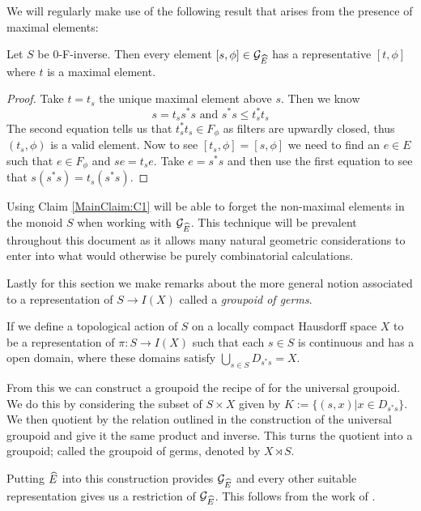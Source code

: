 We will regularly make use of the following result that arises from the presence of maximal elements:

\begin{claim}\label{MainClaim:C1}
Let $S$ be 0-F-inverse. Then every element $[s,\phi] \in \mathcal{G}_{\widehat{E}}$ has a representative $[t,\phi]$ where $t$ is a maximal element.
\end{claim}
\begin{proof}
Take $t=t_{s}$ the unique maximal element above $s$. Then we know 
\begin{equation*}
s = t_{s}s^{*}s \mbox{ and } s^{*}s \leq t_{s}^{*}t_{s}
\end{equation*} 
The second equation tells us that $t_{s}^{*}t_{s} \in F_{\phi}$ as filters are upwardly closed, thus $(t_{s},\phi)$ is a valid element. Now to see $[t_{s},\phi]=[s,\phi]$ we need to find an $e \in E$ such that $e \in F_{\phi}$ and $se=t_{s}e$. Take $e=s^{*}s$ and then use the first equation to see that $s(s^{*}s)=t_{s}(s^{*}s)$.
\end{proof}
Using Claim \ref{MainClaim:C1} will be able to forget the non-maximal elements in the monoid $S$ when working with $\mathcal{G}_{\widehat{E}}$. This technique will be prevalent throughout this document as it allows many natural geometric considerations to enter into what would otherwise be purely combinatorial calculations.

Lastly for this section we make remarks about the more general notion associated to a representation of $S \rightarrow I(X)$ called a \textit{groupoid of germs}.

\begin{remark}
If we define a topological action of $S$ on a locally compact Hausdorff space $X$ to be a representation of $\pi:S \rightarrow I(X)$ such that each $s \in S$ is continuous and has a open domain, where these domains satisfy $\bigcup_{s \in S}D_{s^{*}s} = X$.

From this we can construct a groupoid the recipe of for the universal groupoid. We do this by considering the subset of $S \times X$ given by $K:=\lbrace (s,x) | x \in D_{s^{*}s}\rbrace$. We then quotient by the relation outlined in the construction of the universal groupoid and give it the same product and inverse. This turns the quotient into a groupoid; called the groupoid of germs, denoted by $X \rtimes S$.

Putting $\widehat{E}$ into this construction provides $\mathcal{G}_{\widehat{E}}$ and every other suitable representation gives us a restriction of $\mathcal{G}_{\widehat{E}}$. This follows from the work of \cite{MR2419901}.
 
\end{remark}

